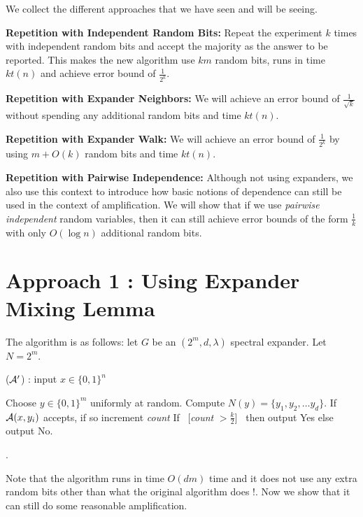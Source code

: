 \noindent We collect the different approaches that we have seen and will be seeing.
\begin{description}
\item{\bf Repetition with Independent Random Bits:}
Repeat the experiment $k$ times with independent random bits and accept the majority as the answer to be reported. This makes the new algorithm use $km$ random bits, runs in time $kt(n)$ and achieve error bound of $\frac{1}{2^{k}}$.
\item{\bf Repetition with Expander Neighbors:}
We will achieve an error bound of $\frac{1}{\sqrt{k}}$ without spending any additional random bits and time $kt(n)$.
\item{\bf Repetition with Expander Walk:}
We will achieve an error bound of $\frac{1}{2^k}$ by using $m+O(k)$ random bits and time $kt(n)$.
\item{\bf Repetition with Pairwise Independence:} Although not using expanders, we also use this context to introduce how basic notions of dependence can still be used in the context of amplification. We will show that if we use {\em pairwise independent} random variables, then it can still achieve error bounds of the form $\frac{1}{k}$ with only $O(\log n)$ additional random bits.
\end{description}

\section{Approach 1 : Using Expander Mixing Lemma}

The algorithm is as follows: let $G$ be an $(2^m,d,\lambda)$ spectral expander. Let $N = 2^m$.
\begin{algorithm}
\label{alg:hittingset-algo}
\caption{(${\cal{A}'}$) : input $x \in \{0,1\}^n$} 
\begin{algorithmic}[1]
\State Choose $y \in \{0,1\}^m$ uniformly at random.
\State Compute $N(y) = \{y_1, y_2, \ldots y_d\}$.
	\State If ${\cal{A}}(x,y_i)$ accepts, if so increment {\em count}
\EndFor
\State If ~[{\em count} $> \frac{k}{2}$]~ then output {\sc Yes} else output {\sc No}.

.
\end{algorithmic}
\end{algorithm}

Note that the algorithm runs in time $O(dm)$ time and it does not use any extra random bits other than what the original algorithm does !. Now we show that it can still do some reasonable amplification.

